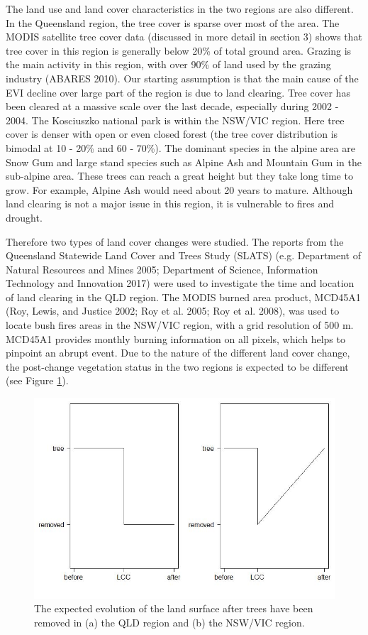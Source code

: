 \documentclass[]{elsarticle} %
\theoremstyle{definition}
\theoremstyle{definition}
\theoremstyle{definition}
\theoremstyle{remark}
\begin{document}
The land use and land cover characteristics in the two regions are also
different. In the Queensland region, the tree cover is sparse over most
of the area. The MODIS satellite tree cover data (discussed in more
detail in section 3) shows that tree cover in this region is generally
below 20\% of total ground area. Grazing is the main activity in this
region, with over 90\% of land used by the grazing industry (ABARES
2010). Our starting assumption is that the main cause of the EVI decline
over large part of the region is due to land clearing. Tree cover has
been cleared at a massive scale over the last decade, especially during
2002 - 2004. The Kosciuszko national park is within the NSW/VIC region.
Here tree cover is denser with open or even closed forest (the tree
cover distribution is bimodal at 10 - 20\% and 60 - 70\%). The dominant
species in the alpine area are Snow Gum and large stand species such as
Alpine Ash and Mountain Gum in the sub-alpine area. These trees can
reach a great height but they take long time to grow. For example,
Alpine Ash would need about 20 years to mature. Although land clearing
is not a major issue in this region, it is vulnerable to fires and
drought.

Therefore two types of land cover changes were studied. The reports from
the Queensland Statewide Land Cover and Trees Study (SLATS) (e.g.
Department of Natural Resources and Mines 2005; Department of Science,
Information Technology and Innovation 2017) were used to investigate the
time and location of land clearing in the QLD region. The MODIS burned
area product, MCD45A1 (Roy, Lewis, and Justice 2002; Roy et al. 2005;
Roy et al. 2008), was used to locate bush fires areas in the NSW/VIC
region, with a grid resolution of 500 m. MCD45A1 provides monthly
burning information on all pixels, which helps to pinpoint an abrupt
event. Due to the nature of the different land cover change, the
post-change vegetation status in the two regions is expected to be
different (see Figure \ref{fig:figure3-tc-simple}).

\begin{figure}
\includegraphics[width=0.9\linewidth]{figures/tc_simple} \caption{The expected evolution of the land surface after trees have been removed in (a) the QLD region and (b) the NSW/VIC region.}\label{fig:figure3-tc-simple}
\end{figure}
\end{document}
